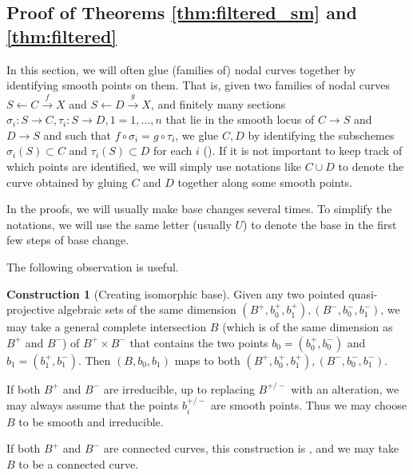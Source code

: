\documentclass{amsart}
\theoremstyle{definition}
\newtheorem{constr}[theorem]{Construction}
\theoremstyle{remark}
\begin{document}
\subsection{Proof of Theorems \ref{thm:filtered_sm} and \ref{thm:filtered}}
    In this section, we will often glue (families of) nodal curves together by identifying smooth points on them. 
    That is, given two families of nodal curves $S \leftarrow C \xrightarrow{f} X$ and $S\leftarrow D \xrightarrow{g} X$, and finitely many sections $\sigma_i:S \to C, \tau_i: S \to D, 1=1, \ldots, n$ that lie in the smooth locus of $C \to S$ and $D \to S$ and such that $f\circ \sigma_i=g\circ \tau_i$, we glue $C, D$ by identifying the subschemes $\sigma_i(S)\subset C$ and $\tau_i(S)\subset D$ for each $i$ (\cite[Theorem 3.4]{Knudsen_projectivity_2}).
    If it is not important to keep track of which points are identified, 
    we will simply use notations like $C\cup D$ to denote the curve obtained by gluing $C$ and $D$ together along some smooth points.

    In the proofs, we will usually make base changes several times.
    To simplify the notations, we will use the same letter (usually $U$) to denote the base in the first few steps of base change.

    The following observation is useful.
    \begin{constr}[Creating isomorphic base]\label{samebase}
    Given any two pointed quasi-projective algebraic sets of the same dimension $(B^+, b_0^+, b_1^+), (B^-, b_0^-, b_1^-)$, we may take a general complete intersection $B$ (which is of the same dimension as $B^+$ and $B^-$) of $B^+\times B^-$ that contains the two points $b_0=(b_0^+, b_0^-)$ and $b_1=(b_1^+, b_1^-)$. 
    Then $(B, b_0, b_1)$ maps to both $(B^+, b_0^+, b_1^+), (B^-, b_0^-, b_1^-)$.
    

    If both $B^+$ and $B^-$ are irreducible, up to replacing $B^{+/-}$ with an alteration, we may always assume that the points $b_i^{+/-}$ are smooth points.
    Thus we may choose $B$ to be smooth and irreducible.
    
    If both $B^+$ and $B^-$ are connected curves, this construction is \cite[26.2]{Kollar_Tian}, and we may take $B$ to be a connected curve.
\end{constr}
    
\end{document}

